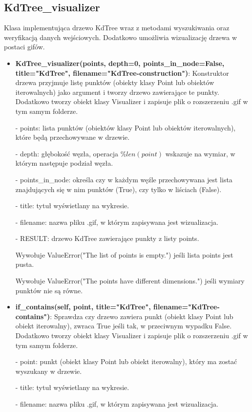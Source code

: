 \documentclass{lab}
\begin{document}
\subsection{KdTree\_visualizer}
Klasa implementująca drzewo KdTree wraz z metodami wyszukiwania oraz weryfikacją danych wejściowych. Dodatkowo umożliwia wizualizację drzewa w postaci gifów.
\begin{itemize}
  \item \textbf{KdTree\_visualizer(points, depth=0, points\_in\_node=False, title="KdTree", filename="KdTree-construction")}:
  Konstruktor drzewa przyjmuje listę punktów (obiekty klasy Point lub obiektów iterowalnych) jako argument i tworzy drzewo zawierające te punkty. Dodatkowo tworzy obiekt klasy Visualizer i zapisuje plik o rozszerzeniu .gif w tym samym folderze.

  - points: lista punktów (obiektów klasy Point lub obiektów iterowalnych), które będą przechowywane w drzewie.

  - depth: głębokość węzła, operacja $\%len(point)$ wskazuje na wymiar, w którym następuje podział węzła.

  - points\_in\_node: określa czy w każdym węźle przechowywana jest lista znajdujących się w nim punktów (True), czy tylko w liściach (False).

  - title: tytuł wyświetlany na wykresie.

  - filename: nazwa pliku .gif, w którym zapisywana jest wizualizacja.

  - RESULT: drzewo KdTree zawierające punkty z listy points.

  Wywołuje ValueError("The list of points is empty.") jeśli lista points jest pusta.

  Wywołuje ValueError("The points have different dimensions.") jeśli wymiary punktów nie są równe.

  \item \textbf{if\_contains(self, point, title="KdTree", filename="KdTree-contains")}:
  Sprawdza czy drzewo zawiera punkt (obiekt klasy Point lub obiekt iterowalny), zwraca True jeśli tak, w przeciwnym wypadku False. Dodatkowo tworzy obiekt klasy Visualizer i zapisuje plik o rozszerzeniu .gif w tym samym folderze.

  - point: punkt (obiekt klasy Point lub obiekt iterowalny), który ma zostać wyszukany w drzewie.

  - title: tytuł wyświetlany na wykresie.

  - filename: nazwa pliku .gif, w którym zapisywana jest wizualizacja.


\end{itemize}
\end{document}
